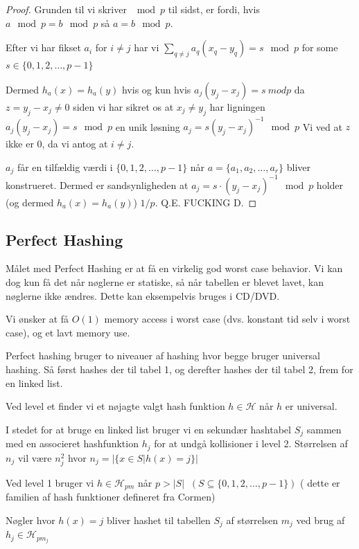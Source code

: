\documentclass[11pt]{article}
\theoremstyle{definition}
\theoremstyle{remark}
\begin{document}
\begin{proof}
    Grunden til vi skriver $\mod p$ til sidst, er fordi, hvis $a \mod p = b \mod p$ så $a = b \mod p$.

    Efter vi har fikset $a_{i}$ for $i \neq j$ har vi $\sum_{q \neq j} a_{q}(x_{q} - y_{q}) = s \mod p$ for some $s \in \{0,1,2, \ldots, p-1\}$

    Dermed $h_{a}(x) = h_{a}(y)$ hvis og kun hvis $a_{j}(y_{j}-x_{j}) = s \ mod p$ da $z = y_{j} - x_{j} \neq 0$ siden vi har sikret os at $x_{j} \neq y_{j}$ har ligningen $a_{j}(y_{j}-x_{j}) = s \mod p$ en unik løsning $a_{j} = s (y_{j}-x_{j})^{-1} \mod p$
    Vi ved at $z$ ikke er 0, da vi antog at $i \neq j$.

    $a_{j}$ får en tilfældig værdi i $\{0, 1, 2, \ldots, p-1\}$ når $a = \{a_{1}, a_{2}, \ldots, a_{r}\}$ bliver konstrueret. Dermed er sandsynligheden at $a_{j} = s \cdot (y_{j} - x_{j})^{-1} \mod p$ holder (og dermed $h_{a}(x) = h_{a}(y)$) $1/p$. Q.E. FUCKING D.
\end{proof}

\subsection{Perfect Hashing}

Målet med Perfect Hashing er at få en virkelig god worst case behavior. Vi kan dog kun få det når nøglerne er statiske, så når tabellen er blevet lavet, kan nøglerne ikke ændres. Dette kan eksempelvis bruges i CD/DVD.

Vi ønsker at få $O(1)$ memory access i worst case (dvs. konstant tid selv i worst case), og et lavt memory use.

Perfect hashing bruger to niveauer af hashing hvor begge bruger universal hashing. Så først hashes der til tabel 1, og derefter hashes der til tabel 2, frem for en linked list. 
  
Ved level et finder vi et nøjagte valgt hash funktion $h \in \mathcal{H}$ når $h$ er universal.

I stedet for at bruge en linked list bruger vi en sekundær hashtabel $S_{j}$ sammen med en associeret hashfunktion $h_{j}$ for at undgå kollisioner i level 2. Størrelsen af $n_{j}$ vil være $n_{j}^{2}$ hvor $n_{j} = |\{x \in S | h(x) = j\}|$

Ved level 1 bruger vi $h \in \mathcal{H}_{pm}$ når $p > |S|\;\;(S \subseteq \{0, 1, 2, \ldots, p-1\})$ ( dette er familien af hash funktioner defineret fra Cormen)

Nøgler hvor $h(x) = j$ bliver hashet til tabellen $S_{j}$ af størrelsen $m_{j}$ ved brug af $h_{j} \in \mathcal{H}_{pm_{j}}$
\end{document}
